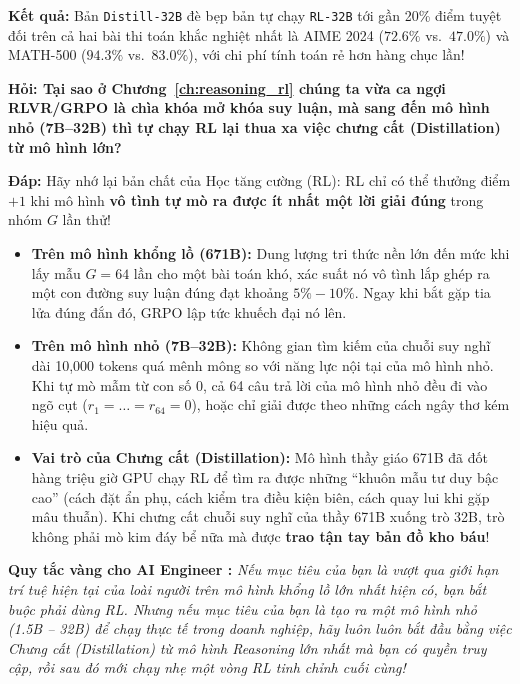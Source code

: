 \textbf{Kết quả:} Bản \texttt{Distill-32B} đè bẹp bản tự chạy \texttt{RL-32B} tới gần 20\% điểm tuyệt đối trên cả hai bài thi toán khắc nghiệt nhất là AIME 2024 ($72.6\%$ vs.~$47.0\%$) và MATH-500 ($94.3\%$ vs.~$83.0\%$), với chi phí tính toán rẻ hơn hàng chục lần!

\begin{debate}
\textbf{Hỏi: Tại sao ở Chương~\ref{ch:reasoning_rl} chúng ta vừa ca ngợi RLVR/GRPO là chìa khóa mở khóa suy luận, mà sang đến mô hình nhỏ (7B--32B) thì tự chạy RL lại thua xa việc chưng cất (Distillation) từ mô hình lớn?}

\textbf{Đáp:} Hãy nhớ lại bản chất của Học tăng cường (RL): RL chỉ có thể thưởng điểm $+1$ khi mô hình \textbf{vô tình tự mò ra được ít nhất một lời giải đúng} trong nhóm $G$ lần thử!
\begin{itemize}
  \item \textbf{Trên mô hình khổng lồ (671B):} Dung lượng tri thức nền lớn đến mức khi lấy mẫu $G = 64$ lần cho một bài toán khó, xác suất nó vô tình lắp ghép ra một con đường suy luận đúng đạt khoảng $5\% - 10\%$. Ngay khi bắt gặp tia lửa đúng đắn đó, GRPO lập tức khuếch đại nó lên.
  \item \textbf{Trên mô hình nhỏ (7B--32B):} Không gian tìm kiếm của chuỗi suy nghĩ dài 10,000 tokens quá mênh mông so với năng lực nội tại của mô hình nhỏ. Khi tự mò mẫm từ con số 0, cả 64 câu trả lời của mô hình nhỏ đều đi vào ngõ cụt ($r_1 = \dots = r_{64} = 0$), hoặc chỉ giải được theo những cách ngây thơ kém hiệu quả.
  \item \textbf{Vai trò của Chưng cất (Distillation):} Mô hình thầy giáo 671B đã đốt hàng triệu giờ GPU chạy RL để tìm ra được những ``khuôn mẫu tư duy bậc cao'' (cách đặt ẩn phụ, cách kiểm tra điều kiện biên, cách quay lui khi gặp mâu thuẫn). Khi chưng cất chuỗi suy nghĩ của thầy 671B xuống trò 32B, trò không phải mò kim đáy bể nữa mà được \textbf{trao tận tay bản đồ kho báu}!
\end{itemize}

\medskip
\textbf{Quy tắc vàng cho AI Engineer \citep{deepseek2025r1}:} \textit{Nếu mục tiêu của bạn là vượt qua giới hạn trí tuệ hiện tại của loài người trên mô hình khổng lồ lớn nhất hiện có, bạn bắt buộc phải dùng RL. Nhưng nếu mục tiêu của bạn là tạo ra một mô hình nhỏ (1.5B -- 32B) để chạy thực tế trong doanh nghiệp, hãy luôn luôn bắt đầu bằng việc Chưng cất (Distillation) từ mô hình Reasoning lớn nhất mà bạn có quyền truy cập, rồi sau đó mới chạy nhẹ một vòng RL tinh chỉnh cuối cùng!}
\end{debate}

